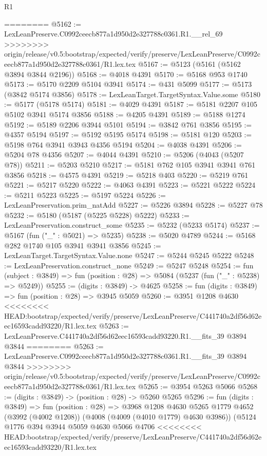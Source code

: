 \begin{lexlean}{R1}
\begin{coremodule}
{{{{{{{{{{{{{{{{{{{{{{{{{{{{{{{{{{{{{{{{{{{{{{{{{{{{{{{{{{{{{{{{{{{{{{{{{{{{{{{{{{{{{{{{{{{{{{{{{{{{{{{{{{{{{{{{{{{{{{{{{{{{{{{{{{{{{{{{{{{{{{{{{{{{{{{{{{{{{{{{{{{{{{{{{{{{{{{{{{{{{{{{{{========
@5162 := LexLeanPreserve.C0992ceecb877a1d950d2e327788c0361.R1.__rel_69
>>>>>>>> origin/release/v0.5:bootstrap/expected/verify/preserve/LexLeanPreserve/C0992ceecb877a1d950d2e327788c0361/R1.lex.tex
@5167 := @5123 (@5161 (@5162 @3894 @3844 @2196))
@5168 := @4018 @4391
@5170 := @5168 @953 @1740
@5173 := @5170 @2209 @5104 @3941
@5174 := @431 @5099
@5177 := @5173 (@3842 @5174 @3856)
@5178 := LexLeanTarget.TargetSyntax.Value.some
@5180 := @5177 (@5178 @5174)
@5181 := @4029 @4391
@5187 := @5181 @2207 @105 @5102 @3941 @5174 @3856
@5188 := @4205 @4391
@5189 := @5188 @1274
@5192 := @5189 @2206 @3944 @5101
@5194 := @3842 @761 @3856
@5195 := @4357 @5194
@5197 := @5192 @5195 @5174
@5198 := @5181 @120
@5203 := @5198 @764 @3941 @3943 @4356 @5194
@5204 := @4038 @4391
@5206 := @5204 @78 @4356
@5207 := @4044 @4391
@5210 := @5206 (@4043 (@5207 @78))
@5211 := @5203 @5210
@5217 := @5181 @762 @105 @3941 @3941 @761 @3856
@5218 := @4575 @4391
@5219 := @5218 @403
@5220 := @5219 @761
@5221 := @5217 @5220
@5222 := @4063 @4391
@5223 := @5221 @5222
@5224 := @5211 @5223
@5225 := @5197 @5224
@5226 := LexLeanPreservation.prim_natAdd
@5227 := @5226 @3894
@5228 := @5227 @78
@5232 := @5180 (@5187 (@5225 @5228) @5222)
@5233 := LexLeanPreservation.construct_some
@5235 := @5232 (@5233 @5174)
@5237 := @5167 (fun ("_" : @5021) => @5235)
@5238 := @5020 @4789
@5244 := @5168 @282 @1740 @105 @3941 @3941 @3856
@5245 := LexLeanTarget.TargetSyntax.Value.none
@5247 := @5244 @5245 @5222
@5248 := LexLeanPreservation.construct_none
@5249 := @5247 @5248
@5254 := fun (subject : @3849) => fun (position : @28) => @5084 (@5237 (fun ("_" : @5238) => @5249))
@5255 := (digits : @3849) -> @4625
@5258 := fun (digits : @3849) => fun (position : @28) => @3945 @5059
@5260 := @3951 @1208 @4630
<<<<<<<< HEAD:bootstrap/expected/verify/preserve/LexLeanPreserve/C441740a2df56d62eec16593cadd93220/R1.lex.tex
@5263 := LexLeanPreserve.C441740a2df56d62eec16593cadd93220.R1.__fits_39 @3894 @3844
========
@5263 := LexLeanPreserve.C0992ceecb877a1d950d2e327788c0361.R1.__fits_39 @3894 @3844
>>>>>>>> origin/release/v0.5:bootstrap/expected/verify/preserve/LexLeanPreserve/C0992ceecb877a1d950d2e327788c0361/R1.lex.tex
@5265 := @3954 @5263 @5066
@5268 := (digits : @3849) -> (position : @28) -> @5260 @5265
@5296 := fun (digits : @3849) =>
  fun (position : @28) =>
  @3968
    @1208
    @4630
    @5265
    @1779
    @4652
    (@3992 (@4002 @1208))
    (@4008 (@4009 (@4010 @1779) @4630 @3986))
    (@5124
      @1776
      @394
      @3944
      @5059
      @4630
      @5066
      @4706
<<<<<<<< HEAD:bootstrap/expected/verify/preserve/LexLeanPreserve/C441740a2df56d62eec16593cadd93220/R1.lex.tex
}}}}}}}}}}}}}}}}}}}}}}}}}}}}}}}}}}}}}}}}}}}}}}}}}}}}}}}}}}}}}}}}}}}}}}}}}}}}}}}}}}}}}}}}}}}}}}}}}}}}}}}}}}}}}}}}}}}}}}}}}}}}}}}}}}}}}}}}}}}}}}}}}}}}}}}}}}}}}}}}}}}}}}}}}}}}}}}}}}}}}}}}}}
\end{coremodule}
\end{lexlean}
